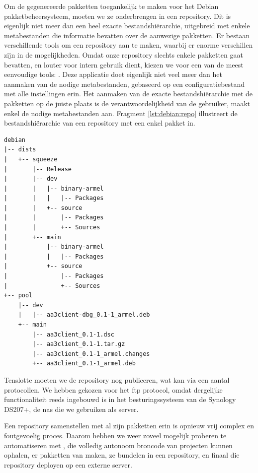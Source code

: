 Om de gegenereerde pakketten toegankelijk te maken voor het Debian pakketbeheersysteem, moeten we ze onderbrengen in een repository. Dit is eigenlijk niet meer dan een heel exacte bestandshiërarchie, uitgebreid met enkele metabestanden die informatie bevatten over de aanwezige pakketten. Er bestaan verschillende tools om een repository aan te maken, waarbij er enorme verschillen zijn in de mogelijkheden. Omdat onze repository slechts enkele pakketten gaat bevatten, en louter voor intern gebruik dient, kiezen we voor een van de meest eenvoudige tools: . Deze applicatie doet eigenlijk niet veel meer dan het aanmaken van de nodige metabestanden, gebaseerd op een configuratiebestand met alle instellingen erin. Het aanmaken van de exacte bestandshiërarchie met de pakketten op de juiste plaats is de verantwoordelijkheid van de gebruiker,  maakt enkel de nodige metabestanden aan. Fragment \ref{lst:debian:repo} illustreert de bestandshiërarchie van een repository met een enkel pakket in.

\begin{lstlisting}[float, caption=Bestandshiërarchie in een Debian repository., label=lst:debian:repo]
debian
|-- dists
|   +-- squeeze
|       |-- Release
|       |-- dev
|       |   |-- binary-armel
|       |   |   |-- Packages
|       |   +-- source
|       |       |-- Packages
|       |       +-- Sources
|       +-- main
|           |-- binary-armel
|           |   |-- Packages
|           +-- source
|               |-- Packages
|               +-- Sources
+-- pool
    |-- dev
    |   |-- aa3client-dbg_0.1-1_armel.deb
    +-- main
        |-- aa3client_0.1-1.dsc
        |-- aa3client_0.1-1.tar.gz
        |-- aa3client_0.1-1_armel.changes
        +-- aa3client_0.1-1_armel.deb
\end{lstlisting}

Tenslotte moeten we de repository nog publiceren, wat kan via een aantal protocollen. We hebben gekozen voor het \ac{ftp} protocol, omdat dergelijke functionaliteit reeds ingebouwd is in het besturingssysteem van de Synology DS207+, de \ac{nas} die we gebruiken als server.

Een repository samenstellen met al zijn pakketten erin is opnieuw vrij complex en foutgevoelig proces. Daarom hebben we weer zoveel mogelijk proberen te automatiseren met , die volledig autonoom broncode van projecten kunnen ophalen, er pakketten van maken, ze bundelen in een repository, en finaal die repository deployen op een externe server.

